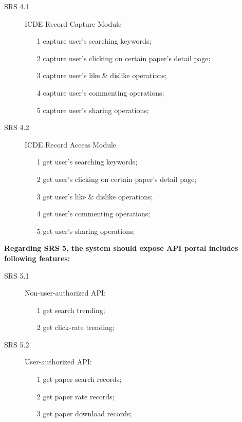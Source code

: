 \begin{description}
	\item[SRS 4.1] ICDE Record Capture Module
		\begin{itemize}
			\item [1]
			      capture user's searching keywords;
			\item [2]
			      capture user's clicking on certain paper's detail page;
			\item [3]
			      capture user's like \& dislike operations;
			\item [4]
			      capture user's commenting operations;
			\item [5]
			      capture user's sharing operations;
		\end{itemize}

		\item[SRS 4.2]ICDE Record Access Module
		\begin{itemize}
			\item [1]
			      get user's searching keywords;
			\item [2]
			      get user's clicking on certain paper's detail page;
			\item [3]
			      get user's like \& dislike operations;
			\item [4]
			      get user's commenting operations;
			\item [5]
			      get user's sharing operations;
		\end{itemize}
\end{description}

\noindent
\textbf{Regarding SRS 5, the system should expose API portal includes following features:}

\begin{description}
	\item[SRS 5.1] Non-user-authorized API:
		\begin{itemize}
			\item [1]
			      get search trending;
			\item [2]
			      get click-rate trending;
		\end{itemize}

	\item[SRS 5.2] User-authorized API:
		\begin{itemize}
			\item [1]
			      get paper search records;
			\item [2]
			      get paper rate records;
			\item [3]
			      get paper download records;
		\end{itemize}
\end{description}

